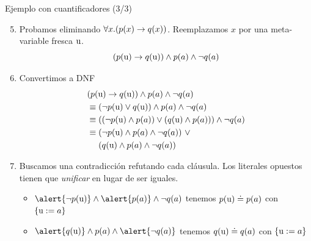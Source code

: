 \documentclass[xcolor={dvipsnames},spanish]{beamer}
\begin{document}
\begin{frame}{Ejemplo con cuantificadores (3/3)}
    \begin{enumerate}
        \setcounter{enumi}{4}
        \item Probamos eliminando $\forall x. (p(x) \to q(x))$. Reemplazamos
        $x$ por una meta-variable fresca $\textrm{u}$.
        \[
            (p(\textrm{u}) \to q(\textrm{u})) \wedge p(a) \wedge \neg q(a)
        \]
        \item Convertimos a DNF
        \begin{align*}
            &(p(\metavar{u}) \fImp q(\metavar{u})) \fAnd p(a) \fAnd \fNot q(a)\\
            &\equiv (\fNot p(\metavar{u}) \fOr q(\metavar{u})) \fAnd p(a) \fAnd \fNot q(a)\\
            &\equiv ( (\fNot p(\metavar{u}) \fAnd p(a)) \fOr (q(\metavar{u}) \fAnd p(a))) \fAnd \fNot q(a)\\
            &\equiv 
            \begin{aligned}[t]
                &(\fNot p(\metavar{u}) \fAnd p(a) \fAnd \fNot q(a))\ \fOr\\
                &(q(\metavar{u}) \fAnd p(a)\fAnd \fNot q(a))
            \end{aligned}
        \end{align*}
        \item Buscamos una contradicción refutando cada cláusula. Los
        literales opuestos tienen que \textit{unificar} en lugar de ser iguales.
        \begin{itemize}
            \item $\alert{\fNot p(\metavar{u})} \fAnd \alert{p(a)} \fAnd \fNot q(a)$ tenemos $p(\textrm{u}) \doteq p(a)$ con $\{\textrm{u} := a\}$
            \item $\alert{q(\metavar{u})} \fAnd p(a) \fAnd \alert{\fNot q(a)}$ tenemos $q(\textrm{u}) \doteq q(a)$ con $\{\textrm{u} := a\}$
        \end{itemize}
    \end{enumerate}
\end{frame}
\end{document}
